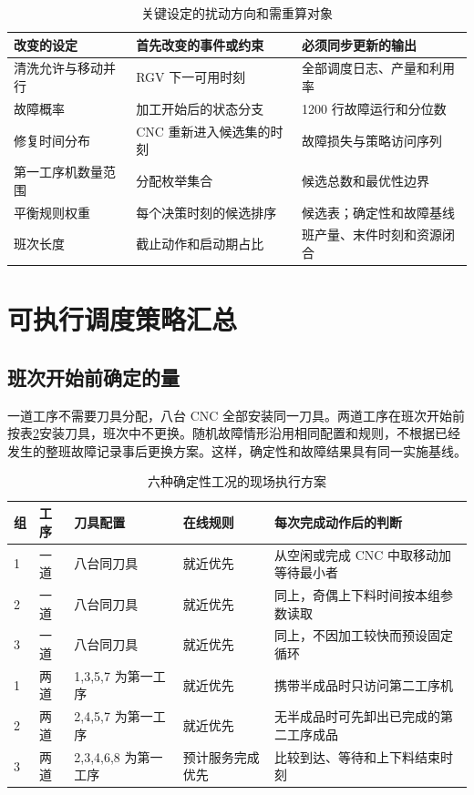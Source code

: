 \documentclass[UTF8,11pt,a4paper]{ctexart}
\begin{document}
\begin{table}[H]
\centering
\caption{关键设定的扰动方向和需重算对象}
\label{tab:sensitivity-contract-b}
\small
\begin{tabularx}{\textwidth}{p{3.7cm}p{4.5cm}X}
\toprule
改变的设定 & 首先改变的事件或约束 & 必须同步更新的输出\\
\midrule
清洗允许与移动并行 & RGV 下一可用时刻 & 全部调度日志、产量和利用率\\
故障概率 & 加工开始后的状态分支 & 1200 行故障运行和分位数\\
修复时间分布 & CNC 重新进入候选集的时刻 & 故障损失与策略访问序列\\
第一工序机数量范围 & 分配枚举集合 & 候选总数和最优性边界\\
平衡规则权重 & 每个决策时刻的候选排序 & 候选表；确定性和故障基线\\
班次长度 & 截止动作和启动期占比 & 班产量、末件时刻和资源闭合\\
\bottomrule
\end{tabularx}
\end{table}

\section{可执行调度策略汇总}

\subsection{班次开始前确定的量}

一道工序不需要刀具分配，八台 CNC 全部安装同一刀具。两道工序在班次开始前按表\ref{tab:operating-plan-b}安装刀具，班次中不更换。随机故障情形沿用相同配置和规则，不根据已经发生的整班故障记录事后更换方案。这样，确定性和故障结果具有同一实施基线。

\begin{table}[H]
\centering
\caption{六种确定性工况的现场执行方案}
\label{tab:operating-plan-b}
\small
\begin{tabularx}{\textwidth}{p{1.3cm}p{2.1cm}p{3.4cm}p{3.0cm}X}
\toprule
组 & 工序 & 刀具配置 & 在线规则 & 每次完成动作后的判断\\
\midrule
1 & 一道 & 八台同刀具 & 就近优先 & 从空闲或完成 CNC 中取移动加等待最小者\\
2 & 一道 & 八台同刀具 & 就近优先 & 同上，奇偶上下料时间按本组参数读取\\
3 & 一道 & 八台同刀具 & 就近优先 & 同上，不因加工较快而预设固定循环\\
1 & 两道 & 1,3,5,7 为第一工序 & 就近优先 & 携带半成品时只访问第二工序机\\
2 & 两道 & 2,4,5,7 为第一工序 & 就近优先 & 无半成品时可先卸出已完成的第二工序成品\\
3 & 两道 & 2,3,4,6,8 为第一工序 & 预计服务完成优先 & 比较到达、等待和上下料结束时刻\\
\bottomrule
\end{tabularx}
\end{table}
\end{document}

